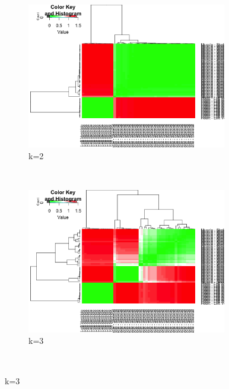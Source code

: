   \begin{figure}[ht]
    \centering
    \begin{subfigure}[t]{0.5\textwidth}
        \centering
        \includegraphics[height=2.5in]{../plots/hierarchical_admix_2.png}
        \caption{k=2}
    \end{subfigure}%
    ~ 
    \begin{subfigure}[t]{0.5\textwidth}
        \centering
        \includegraphics[height=2.5in]{../plots/hierarchical_admix_3.png}
        \caption{k=3}
    \end{subfigure} \\
    

\end{figure}
